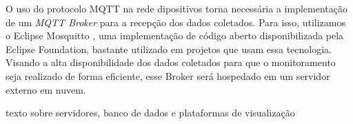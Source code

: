 \documentclass[../monografia.tex]{subfiles}
\begin{document}
O uso do protocolo MQTT na rede dipositivos torna necessária a implementação de um \textit{MQTT Broker} para a recepção dos dados coletados. Para isso, utilizamos o Eclipse Mosquitto \cite{mosquitto}, uma implementação de código aberto disponibilizada pela Eclipse Foundation, bastante utilizado em projetos que usam essa tecnologia. Visando a alta disponibilidade dos dados coletados para que o monitoramento seja realizado de forma eficiente, esse Broker será hospedado em um servidor externo em nuvem. 

texto sobre servidores, banco de dados e plataformas de visualização


\end{document}
